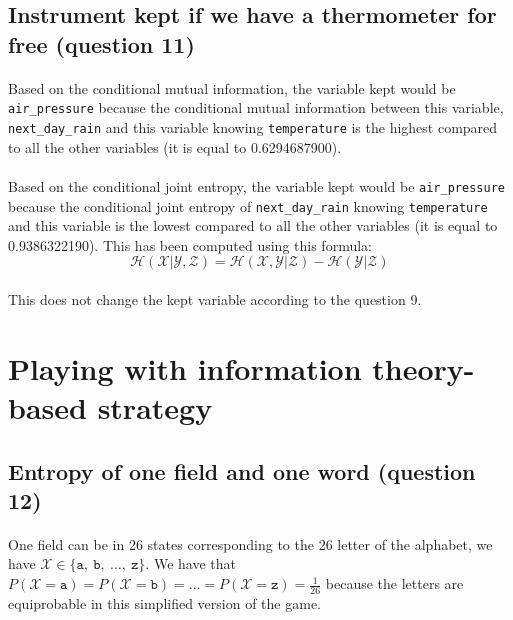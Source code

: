 \documentclass[a4paper, 11pt, oneside]{article}
\begin{document}
\subsection{Instrument kept if we have a thermometer for free (question 11)}

\paragraph{}Based on the conditional mutual information, the variable kept would be \texttt{air\_pressure} because the conditional mutual information between this variable, \texttt{next\_day\_rain} and this variable knowing \texttt{temperature} is the highest compared to all the other variables (it is equal to 0.6294687900). 

\paragraph{}Based on the conditional joint entropy, the variable kept would be \texttt{air\_pressure} because the conditional joint entropy of \texttt{next\_day\_rain} knowing \texttt{temperature} and this variable is the lowest compared to all the other variables (it is equal to 0.9386322190). This has been computed using this formula: 
$$\mathcal{H}(\mathcal{X} | \mathcal{Y}, \mathcal{Z}) = \mathcal{H}(\mathcal{X}, \mathcal{Y} | \mathcal{Z}) - \mathcal{H}(\mathcal{Y} | \mathcal{Z})$$

\paragraph{}This does not change the kept variable according to the question 9.

\section{Playing with information theory-based strategy}

\subsection{Entropy of one field and one word (question 12)}

\paragraph{}One field can be in 26 states corresponding to the 26 letter of the alphabet, we have $\mathcal{X} \in \{\texttt{a}, \ \texttt{b}, \ \ldots , \ \texttt{z}\}$.
We have that $P(\mathcal{X} = \texttt{a}) = P(\mathcal{X} = \texttt{b}) = \ldots = P(\mathcal{X} = \texttt{z}) =\frac{1}{26}$ because the letters are equiprobable in this simplified version of the game.
\end{document}
